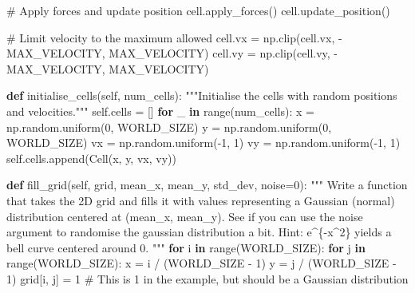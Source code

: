 \documentclass[
  letterpaper,
  DIV=11,
  numbers=noendperiod]{scrreprt}
\newenvironment{Shaded}{\begin{snugshade}}{\end{snugshade}}
\newcommand{\BuiltInTok}[1]{\textcolor[rgb]{0.00,0.23,0.31}{#1}}
\newcommand{\CommentTok}[1]{\textcolor[rgb]{0.37,0.37,0.37}{#1}}
\newcommand{\ControlFlowTok}[1]{\textcolor[rgb]{0.00,0.23,0.31}{\textbf{#1}}}
\newcommand{\DecValTok}[1]{\textcolor[rgb]{0.68,0.00,0.00}{#1}}
\newcommand{\KeywordTok}[1]{\textcolor[rgb]{0.00,0.23,0.31}{\textbf{#1}}}
\newcommand{\NormalTok}[1]{\textcolor[rgb]{0.00,0.23,0.31}{#1}}
\newcommand{\OperatorTok}[1]{\textcolor[rgb]{0.37,0.37,0.37}{#1}}
\newcommand{\VariableTok}[1]{\textcolor[rgb]{0.07,0.07,0.07}{#1}}
\theoremstyle{definition}
\theoremstyle{remark}
\begin{document}
\begin{tcolorbox}
\begin{Shaded}
\begin{Highlighting}[]
            \CommentTok{\# Apply forces and update position}
\NormalTok{            cell.apply\_forces()}
\NormalTok{            cell.update\_position()}

            \CommentTok{\# Limit velocity to the maximum allowed}
\NormalTok{            cell.vx }\OperatorTok{=}\NormalTok{ np.clip(cell.vx, }\OperatorTok{{-}}\NormalTok{MAX\_VELOCITY, MAX\_VELOCITY)}
\NormalTok{            cell.vy }\OperatorTok{=}\NormalTok{ np.clip(cell.vy, }\OperatorTok{{-}}\NormalTok{MAX\_VELOCITY, MAX\_VELOCITY)}

    \KeywordTok{def}\NormalTok{ initialise\_cells(}\VariableTok{self}\NormalTok{, num\_cells):}
        \CommentTok{"""Initialise the cells with random positions and velocities."""}
        \VariableTok{self}\NormalTok{.cells }\OperatorTok{=}\NormalTok{ []}
        \ControlFlowTok{for}\NormalTok{ \_ }\KeywordTok{in} \BuiltInTok{range}\NormalTok{(num\_cells):}
\NormalTok{            x }\OperatorTok{=}\NormalTok{ np.random.uniform(}\DecValTok{0}\NormalTok{, WORLD\_SIZE)}
\NormalTok{            y }\OperatorTok{=}\NormalTok{ np.random.uniform(}\DecValTok{0}\NormalTok{, WORLD\_SIZE)}
\NormalTok{            vx }\OperatorTok{=}\NormalTok{ np.random.uniform(}\OperatorTok{{-}}\DecValTok{1}\NormalTok{, }\DecValTok{1}\NormalTok{)}
\NormalTok{            vy }\OperatorTok{=}\NormalTok{ np.random.uniform(}\OperatorTok{{-}}\DecValTok{1}\NormalTok{, }\DecValTok{1}\NormalTok{)}
            \VariableTok{self}\NormalTok{.cells.append(Cell(x, y, vx, vy))}

    \KeywordTok{def}\NormalTok{ fill\_grid(}\VariableTok{self}\NormalTok{, grid, mean\_x, mean\_y, std\_dev, noise}\OperatorTok{=}\DecValTok{0}\NormalTok{):}
        \CommentTok{"""}
\CommentTok{        Write a function that takes the 2D grid and fills it with values representing }
\CommentTok{        a Gaussian (normal) distribution centered at (mean\_x, mean\_y). See}
\CommentTok{        if you can use the \textquotesingle{}noise\textquotesingle{} argument to randomise the gaussian distribution a bit.}
\CommentTok{        }
\CommentTok{        Hint: e\^{}\{{-}x\^{}2\} yields a bell curve centered around 0. }
\CommentTok{        }
\CommentTok{        """}
        \ControlFlowTok{for}\NormalTok{ i }\KeywordTok{in} \BuiltInTok{range}\NormalTok{(WORLD\_SIZE):}
            \ControlFlowTok{for}\NormalTok{ j }\KeywordTok{in} \BuiltInTok{range}\NormalTok{(WORLD\_SIZE):}
\NormalTok{                x }\OperatorTok{=}\NormalTok{ i }\OperatorTok{/}\NormalTok{ (WORLD\_SIZE }\OperatorTok{{-}} \DecValTok{1}\NormalTok{)}
\NormalTok{                y }\OperatorTok{=}\NormalTok{ j }\OperatorTok{/}\NormalTok{ (WORLD\_SIZE }\OperatorTok{{-}} \DecValTok{1}\NormalTok{)}
\NormalTok{                grid[i, j] }\OperatorTok{=} \DecValTok{1} \CommentTok{\# This is 1 in the example, but should be a Gaussian distribution}


\end{Highlighting}
\end{Shaded}
\end{tcolorbox}
\end{document}
